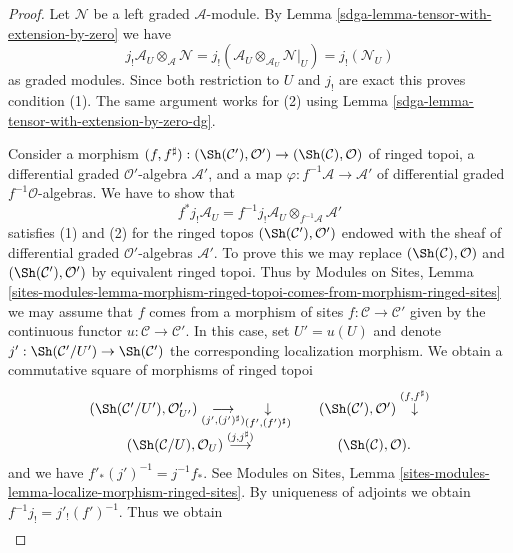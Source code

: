\begin{proof}

Let $\mathcal{N}$ be a left graded $\mathcal{A}$-module.
By Lemma \ref{sdga-lemma-tensor-with-extension-by-zero} we have
$$
j_!\mathcal{A}_U \otimes_\mathcal{A} \mathcal{N} =
j_!(\mathcal{A}_U \otimes_{\mathcal{A}_U} \mathcal{N}|_U) =
j_!(\mathcal{N}_U)
$$
as graded modules.
Since both restriction to $U$ and $j_!$ are exact this proves
condition (1). The same argument works for (2) using
Lemma \ref{sdga-lemma-tensor-with-extension-by-zero-dg}.

\medskip\noindent
Consider a morphism $(f, f^\sharp) : (\Sh(\mathcal{C}'), \mathcal{O}')
\to (\Sh(\mathcal{C}), \mathcal{O})$
of ringed topoi, a differential graded $\mathcal{O}'$-algebra
$\mathcal{A}'$, and a map $\varphi : f^{-1}\mathcal{A} \to \mathcal{A}'$
of differential graded $f^{-1}\mathcal{O}$-algebras.
We have to show that
$$
f^*j_!\mathcal{A}_U =
f^{-1}j_!\mathcal{A}_U \otimes_{f^{-1}\mathcal{A}} \mathcal{A}'
$$
satisfies (1) and (2) for the ringed topos
$(\Sh(\mathcal{C}'), \mathcal{O}')$ endowed with the
sheaf of differential graded $\mathcal{O}'$-algebras
$\mathcal{A}'$. To prove this we may replace
$(\Sh(\mathcal{C}), \mathcal{O})$ and
$(\Sh(\mathcal{C}'), \mathcal{O}')$ by equivalent ringed topoi.
Thus by
Modules on Sites, Lemma
\ref{sites-modules-lemma-morphism-ringed-topoi-comes-from-morphism-ringed-sites}
we may assume that $f$ comes from a morphism of sites
$f : \mathcal{C} \to \mathcal{C}'$ given by the continuous
functor $u : \mathcal{C} \to \mathcal{C}'$.
In this case, set $U' = u(U)$ and denote
$j' : \Sh(\mathcal{C}'/U') \to \Sh(\mathcal{C}')$ the
corresponding localization morphism.
We obtain a commutative square of morphisms of ringed topoi
$$
\begin{array}{ccc}(\Sh(\mathcal{C}'/U'), \mathcal{O}'_{U'})
\underset{(j', (j')^\sharp)}{\longrightarrow}\underset{(f', (f')^\sharp)}{\downarrow} &  & (\Sh(\mathcal{C}'), \mathcal{O}')
\overset{(f, f^\sharp)}{\downarrow} \\ (\Sh(\mathcal{C}/U), \mathcal{O}_U)
\overset{(j, j^\sharp)}{\longrightarrow} &  & (\Sh(\mathcal{C}), \mathcal{O}).\end{array}
$$
and we have $f'_*(j')^{-1} = j^{-1}f_*$. See
Modules on Sites, Lemma
\ref{sites-modules-lemma-localize-morphism-ringed-sites}.
By uniqueness of adjoints we obtain
$f^{-1}j_! = j'_!(f')^{-1}$. Thus we obtain
\begin{align*}

\end{align*}
\end{proof}
